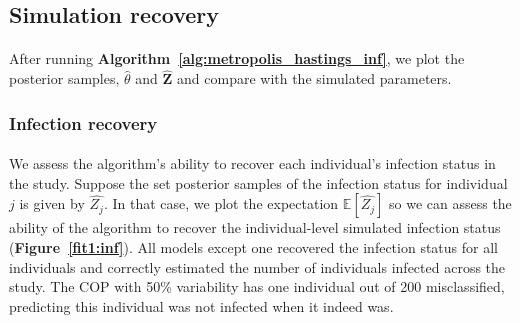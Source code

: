 \subsection{Simulation recovery }
\paragraph{} After running \textbf{Algorithm~\ref{alg:metropolis_hastings_inf}}, we plot the posterior samples, $\hat{\theta}$ and $\hat{\mathbf{Z}}$ and compare with the simulated parameters.

\subsubsection{Infection recovery}

\paragraph{}We assess the algorithm's ability to recover each individual's infection status in the study. Suppose the set posterior samples of the infection status for individual $j$ is given by $\hat{Z_j} $. In that case, we plot the expectation $\mathbb{E}[\hat{Z_j}]$ so we can assess the ability of the algorithm to recover the individual-level simulated infection status (\textbf{Figure~\ref{fit1:inf}}). All models except one recovered the infection status for all individuals and correctly estimated the number of individuals infected across the study. The COP with 50\% variability has one individual out of 200 misclassified, predicting this individual was not infected when it indeed was. 


